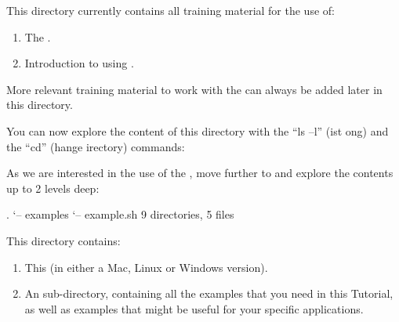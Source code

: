This directory currently contains all training material for the use of:

\begin{enumerate}
\item  The .
\item  Introduction to using .
\end{enumerate}

More relevant training material to work with the \hpc can always be added
later in this directory.

You can now explore the content of this directory with the ``ls --l''
(ist ong) and the ``cd'' (hange
irectory) commands:

As we are interested in the use of the , move further to
 and explore the contents up to 2 levels deep:

\begin{prompt}
.
`-- examples
    `-- example.sh
9 directories, 5 files
\end{prompt}

This directory contains:

\begin{enumerate}
  \item This  (in either a Mac, Linux or Windows version).
  \item An  sub-directory, containing all the
    examples that you need in this Tutorial, as well as examples that might be
    useful for your specific applications.
\end{enumerate}

